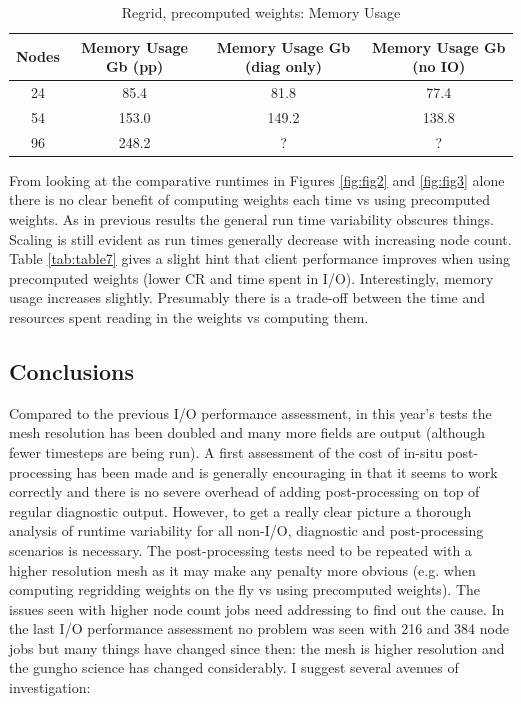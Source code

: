\begin{table}[ht!]
\scriptsize
  \begin{center}
    \caption{Regrid, precomputed weights: Memory Usage}
    \label{tab:table8}
     \begin{tabular}{|c|c|c|c|}
      \textbf{Nodes} & \textbf{Memory Usage Gb (pp) } & \textbf{Memory Usage Gb (diag only)} & \textbf{Memory Usage Gb (no IO)} \\
      \hline
      24 & 85.4 & 81.8 & 77.4 \\
      54 & 153.0 & 149.2 & 138.8 \\
      96 & 248.2 & ? & ? \\
    \end{tabular}
  \end{center}
\end{table}

\normalsize

From looking at the comparative runtimes in Figures \ref{fig:fig2} and \ref{fig:fig3} alone there is no clear benefit of computing weights each time vs using precomputed weights. As in previous results the general run time variability obscures things. Scaling is still evident as run times generally decrease with
increasing node count. Table \ref{tab:table7} gives a slight hint that client performance improves when using precomputed weights (lower CR and time spent in I/O).
Interestingly, memory usage increases slightly. Presumably there is a trade-off between the time and resources spent reading in the weights vs computing them.

\subsection{Conclusions}

Compared to the previous I/O performance assessment, in this year's tests the mesh resolution has been doubled and many more fields are output (although fewer timesteps are being run). A first assessment of the cost of in-situ post-processing has been made and is generally encouraging in that it seems to work correctly and there is no severe overhead of adding post-processing on top of regular diagnostic output. However, to get a really clear picture a thorough analysis of runtime variability for all non-I/O, diagnostic and post-processing scenarios is necessary. The post-processing tests need to be repeated with a higher resolution mesh as it may make any penalty more obvious (e.g. when computing regridding weights on the fly vs using precomputed weights). The issues seen with higher node count jobs need addressing to find out the cause. In the last I/O performance assessment no problem was seen with 216 and 384 node jobs but many things have changed since then: the mesh is higher resolution and the gungho science has changed considerably. 
I suggest several avenues of investigation:

